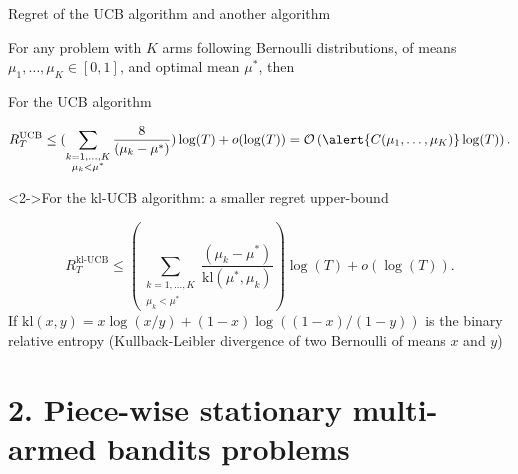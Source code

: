 \documentclass[11pt,english,ignorenonframetext,]{beamer}
\begin{document}
\begin{frame}{Regret of the UCB algorithm and another algorithm}

  For any problem with $K$ arms following Bernoulli distributions, of means $\mu_1,\dots,\mu_K \in[0,1]$, and optimal mean $\mu^*$, then

  \begin{exampleblock}{For the UCB algorithm}
    \begin{small}
      \[ R_T^{\mathrm{UCB}} \leq ( \sum_{\substack{k=1,\dots,K \\ \mu_k < \mu^*}} \frac{8}{(\mu_k - \mu^*)} ) \log(T) + o(\log(T)) = \mathcal{O}\left( \alert{C(\mu_1,\dots,\mu_K)} \log(T) \right). \]
    \end{small}%
  \end{exampleblock}

  \begin{exampleblock}<2->{For the kl-UCB algorithm: a smaller regret upper-bound}
    \begin{small}
      \[ R_T^{\mathrm{kl}\text{-}\mathrm{UCB}} \leq ( \sum_{\substack{k=1,\dots,K \\ \mu_k < \mu^*}} \frac{(\mu_k - \mu^*)}{\mathrm{kl}(\mu^*, \mu_k)} ) \log(T) + o(\log(T)). \]
      If $\mathrm{kl}(x, y) = x \log(x/y) + (1-x) \log((1-x)/(1-y))$ is the binary relative entropy (Kullback-Leibler divergence of two Bernoulli of means $x$ and $y$)
    \end{small}%
  \end{exampleblock}

\end{frame}


\section{\hfill{}2. Piece-wise stationary multi-armed bandits problems\hfill{}}
\end{document}
